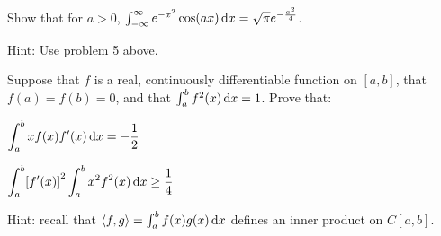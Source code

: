 \documentclass{../homework}
\begin{document}
\begin{problems}
\item Show that for \(a > 0\),
  \(\int_{-\infty}^\infty e^{-x^2} \cos(ax) \mathop{}\!\mathrm d x = \sqrt \pi
  e^{-\frac{a^2}{4}}\).

  Hint: Use problem 5 above.

  \begin{solution}
  \end{solution}

\item Suppose that \(f\) is a real, continuously differentiable
  function on \([a, b]\), that \(f(a) = f(b) = 0\), and that
  \(\int_a^b f^2(x) \mathop{}\!\mathrm d x = 1\).  Prove that:
  \begin{problems}
  \item \(\displaystyle\int_a^b x f(x) f'(x) \mathop{}\!\mathrm d x = -\frac 1 2\)

    \begin{solution}
    \end{solution}

  \item
    \(\displaystyle\int_a^b \sbr*{f'(x)}^2 \int_a^b x^2 f^2(x) \dif x
    \ge \frac 1 4\)

    Hint: recall that \(\langle f, g\rangle = \int_a^b f(x) g(x) \mathop{}\!\mathrm d x\)
    defines an inner product on \(C[a, b]\).

    \begin{solution}
    \end{solution}

  \end{problems}

\end{problems}
\end{document}
